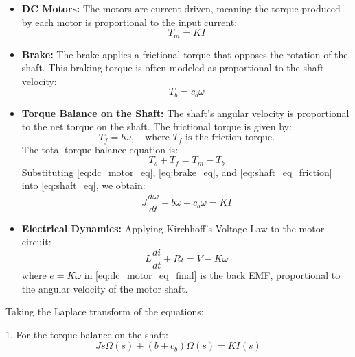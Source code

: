 \begin{itemize}
    \item \textbf{DC Motors:} The motors are current-driven, meaning the torque produced by each motor is proportional to the input current:
    \begin{equation}
        T_m = K I
        \label{eq:dc_motor_eq}
    \end{equation}
    
    \item \textbf{Brake:} The brake applies a frictional torque that opposes the rotation of the shaft. This braking torque is often modeled as proportional to the shaft velocity:
    \begin{equation}
        T_b = c_b \omega
        \label{eq:brake_eq}
    \end{equation}
    
    \item \textbf{Torque Balance on the Shaft:} The shaft's angular velocity is proportional to the net torque on the shaft. The frictional torque is given by:
    \begin{equation}
        T_f = b \omega, \quad \text{where } T_f \text{ is the friction torque.}
        \label{eq:shaft_eq_friction}
    \end{equation}
    The total torque balance equation is:
    \begin{equation}
        T_s + T_f = T_m - T_b
        \label{eq:shaft_eq}
    \end{equation}
    Substituting \eqref{eq:dc_motor_eq}, \eqref{eq:brake_eq}, and \eqref{eq:shaft_eq_friction} into \eqref{eq:shaft_eq}, we obtain:
    \begin{equation}
        J \frac{d\omega}{dt} + b \omega + c_b \omega = K I
        \label{eq:shaft_eq_final}
    \end{equation}
    
    \item \textbf{Electrical Dynamics:} Applying Kirchhoff's Voltage Law to the motor circuit:
    \begin{equation}
        L\frac{d i}{dt} + R i = V - K \omega
        \label{eq:dc_motor_eq_final}
    \end{equation}
    where \( e = K \omega \) in \eqref{eq:dc_motor_eq_final} is the back EMF, proportional to the angular velocity of the motor shaft.
\end{itemize}

Taking the Laplace transform of the equations:

1. For the torque balance on the shaft:
\begin{equation}
    J s \Omega(s) + (b + c_b) \Omega(s) = K I(s)
    \label{eq:shaft_eq_final_laplace}
\end{equation}

